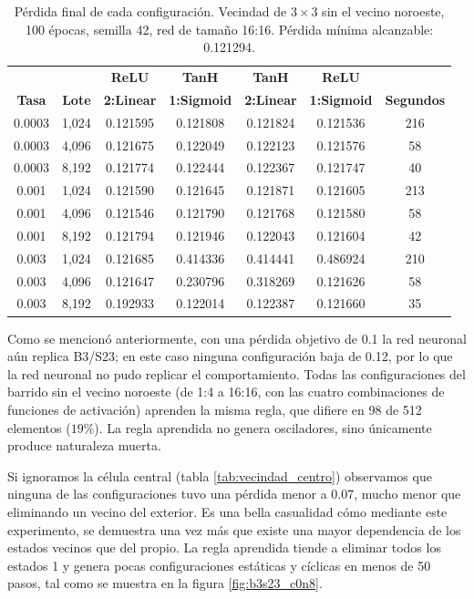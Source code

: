 \begin{table}[H]
	\centering
	\small
	\begin{tabular}{ccccccc}
		\toprule
		& & \textbf{ReLU} & \textbf{TanH} & \textbf{TanH} & \textbf{ReLU} &  \\
		\textbf{Tasa} & \textbf{Lote} & \textbf{2:Linear }&  \textbf{1:Sigmoid }& \textbf{2:Linear  }& \textbf{1:Sigmoid} & \textbf{Segundos}  \\
		\midrule
		0.0003 & 1,024 & 0.121595 & 0.121808 & 0.121824 & 0.121536 & 216 \\
		0.0003 & 4,096 & 0.121675 & 0.122049 & 0.122123 & 0.121576 & 58 \\
		0.0003 & 8,192 & 0.121774 & 0.122444 & 0.122367 & 0.121747 & 40 \\
		\midrule
		0.001 & 1,024 & 0.121590 & 0.121645 & 0.121871 & 0.121605 & 213 \\
		0.001 & 4,096 & 0.121546 & 0.121790 & 0.121768 & 0.121580 & 58 \\
		0.001 & 8,192 & 0.121794 & 0.121946 & 0.122043 & 0.121604 & 42 \\
		\midrule
		0.003 & 1,024 & 0.121685 & 0.414336 & 0.414441 & 0.486924 & 210 \\
		0.003 & 4,096 & 0.121647 & 0.230796 & 0.318269 & 0.121626 & 58 \\
		0.003 & 8,192 & 0.192933 & 0.122014 & 0.122387 & 0.121660 & 35 \\
		\bottomrule
	\end{tabular}
	\caption{Pérdida final de cada configuración. Vecindad de $3 \times 3$ sin el vecino noroeste, 100 épocas, semilla 42, red de tamaño 16:16. Pérdida mínima alcanzable: 0.121294.}
	\label{tab:vecindad_ajuste_16x16}
\end{table}

Como se mencionó anteriormente, con una pérdida objetivo de 0.1 la red neuronal aún replica B3/S23; en este caso ninguna configuración baja de 0.12, por lo que la red neuronal no pudo replicar el comportamiento. Todas las configuraciones del barrido sin el vecino noroeste (de 1:4 a 16:16, con las cuatro combinaciones de funciones de activación) aprenden la misma regla, que difiere en 98 de 512 elementos ($19\%$). La regla aprendida no genera osciladores, sino únicamente produce naturaleza muerta. 

Si ignoramos la célula central (tabla \ref{tab:vecindad_centro}) observamos que ninguna de las configuraciones tuvo una pérdida menor a 0.07, mucho menor que eliminando un vecino del exterior. Es una bella casualidad cómo mediante este experimento, se demuestra una vez más que existe una mayor dependencia de los estados vecinos que del propio. La regla aprendida tiende a eliminar todos los estados 1 y genera pocas configuraciones estáticas y cíclicas en menos de 50 pasos, tal como se muestra en la figura \ref{fig:b3s23_c0n8}.

